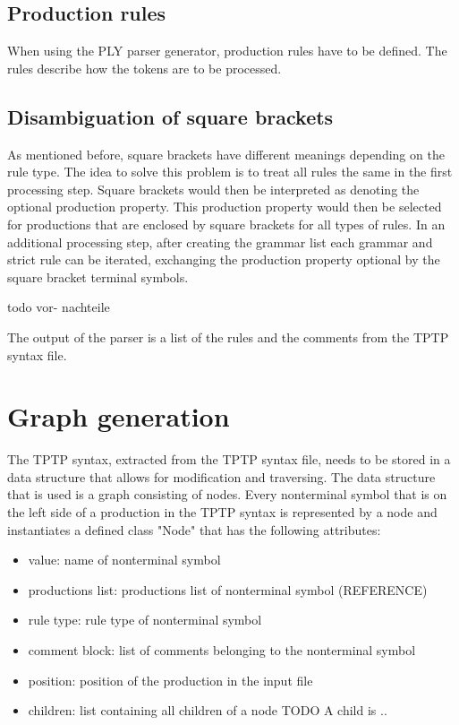 \subsection{Production rules}
When using the \ac{PLY} parser generator, production rules have to be defined. The rules describe how the tokens are to be processed.
\subsection{Disambiguation of  square brackets}
As mentioned before, square brackets have different meanings depending on the rule type.
The idea to solve this problem is to treat all rules the same in the first processing step.
Square brackets would then be interpreted as denoting the optional production property.
This production property would then be selected for productions that are enclosed by square brackets for all types of rules.
In an additional processing step, after creating the grammar list each grammar and strict rule can be iterated, exchanging the production property optional by the square bracket terminal symbols.

todo vor- nachteile


The output of the parser is a list of the rules and the comments from the \ac{TPTP} syntax file.
\section{Graph generation}\label{sec:ConceptGraphGeneration}
The \ac{TPTP} syntax, extracted from the \ac{TPTP} syntax file, needs to be stored in a data structure that allows for modification and traversing.
The data structure that is used is a graph consisting of nodes. 
Every nonterminal symbol that is on the left side of a production in the \ac{TPTP} syntax is represented by a node and instantiates a defined class "Node" that has the following attributes:
\begin{itemize}
\item value: name of nonterminal symbol
\item productions list: productions list of nonterminal symbol (REFERENCE)
\item rule type:  rule type of nonterminal symbol
\item comment block: list of comments belonging to the nonterminal symbol
\item position: position of the production in the input file
\item children: list containing all children of a node
TODO A child is ..
\end{itemize} 

